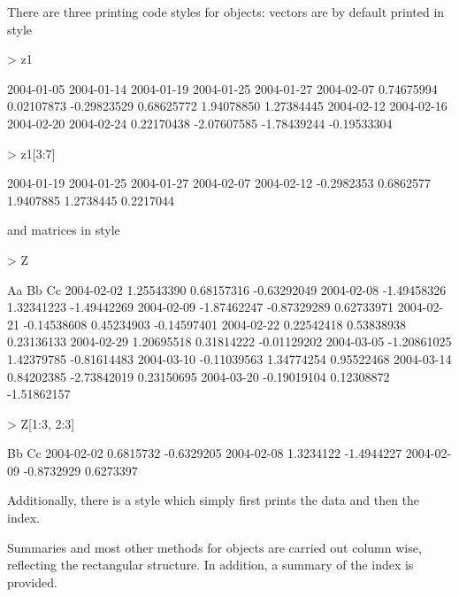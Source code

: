 \documentclass{Z}
\begin{document}
There are three printing code styles for  objects: vectors are by default
printed in  style
\begin{Schunk}
\begin{Sinput}
> z1
\end{Sinput}
\begin{Soutput}
 2004-01-05  2004-01-14  2004-01-19  2004-01-25  2004-01-27  2004-02-07 
 0.74675994  0.02107873 -0.29823529  0.68625772  1.94078850  1.27384445 
 2004-02-12  2004-02-16  2004-02-20  2004-02-24 
 0.22170438 -2.07607585 -1.78439244 -0.19533304 
\end{Soutput}
\begin{Sinput}
> z1[3:7]
\end{Sinput}
\begin{Soutput}
2004-01-19 2004-01-25 2004-01-27 2004-02-07 2004-02-12 
-0.2982353  0.6862577  1.9407885  1.2738445  0.2217044 
\end{Soutput}
\end{Schunk}
and matrices in  style
\begin{Schunk}
\begin{Sinput}
> Z
\end{Sinput}
\begin{Soutput}
           Aa          Bb          Cc         
2004-02-02  1.25543390  0.68157316 -0.63292049
2004-02-08 -1.49458326  1.32341223 -1.49442269
2004-02-09 -1.87462247 -0.87329289  0.62733971
2004-02-21 -0.14538608  0.45234903 -0.14597401
2004-02-22  0.22542418  0.53838938  0.23136133
2004-02-29  1.20695518  0.31814222 -0.01129202
2004-03-05 -1.20861025  1.42379785 -0.81614483
2004-03-10 -0.11039563  1.34774254  0.95522468
2004-03-14  0.84202385 -2.73842019  0.23150695
2004-03-20 -0.19019104  0.12308872 -1.51862157
\end{Soutput}
\begin{Sinput}
> Z[1:3, 2:3]
\end{Sinput}
\begin{Soutput}
           Bb         Cc        
2004-02-02  0.6815732 -0.6329205
2004-02-08  1.3234122 -1.4944227
2004-02-09 -0.8732929  0.6273397
\end{Soutput}
\end{Schunk}
Additionally, there is a  style which simply first prints the data 
and then the index.

Summaries and most other methods for  objects are carried out
column wise, reflecting the rectangular structure. In addition,
a summary of the index is provided.
\end{document}
